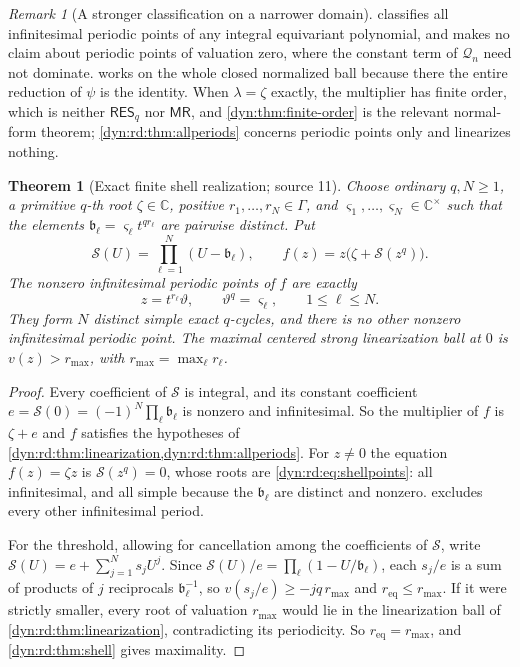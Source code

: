 \documentclass[11pt,letterpaper]{article}
\newtheorem{theorem}{Theorem}[section]
\theoremstyle{definition}
\theoremstyle{remark}
\newtheorem{remark}[remark]{Remark}
\newcommand{\C}{\mathbb C}
\newcommand{\resq}{\mathsf{RES}_q}
\newcommand{\mres}{\mathsf{MR}}
\numberwithin{equation}{section}
\begin{document}
\begin{remark}[A stronger classification on a narrower domain]
\label{dyn:rd:rem:narrower}
 classifies all infinitesimal periodic points of
any integral equivariant polynomial, and makes no claim about periodic points
of valuation zero, where the constant term of $\mathcal Q_n$ need not
dominate.  works on the whole closed
normalized ball because there the entire reduction of $\psi$ is the
identity. When $\lambda=\zeta$ exactly, the multiplier has finite order,
which is neither $\resq$ nor $\mres$, and \cref{dyn:thm:finite-order} is
the relevant normal-form theorem; \cref{dyn:rd:thm:allperiods} concerns
periodic points only and linearizes nothing.
\end{remark}

\begin{theorem}[Exact finite shell realization; source 11]
\label{dyn:rd:thm:allshells}
Choose ordinary $q,N\ge1$, a primitive $q$-th root $\zeta\in\C$, positive
$r_1,\dots,r_N\in\Gamma$, and $\varsigma_1,\dots,\varsigma_N\in\C^{\times}$
such that the elements $\mathfrak b_\ell=\varsigma_\ell t^{qr_\ell}$ are
pairwise distinct. Put
\begin{equation}\label{dyn:rd:eq:shellf}
 \mathcal S(U)=\prod_{\ell=1}^{N}(U-\mathfrak b_\ell),\qquad
 f(z)=z\bigl(\zeta+\mathcal S(z^{q})\bigr).
\end{equation}
The nonzero infinitesimal periodic points of $f$ are exactly
\begin{equation}\label{dyn:rd:eq:shellpoints}
 z=t^{r_\ell}\vartheta,\qquad \vartheta^{q}=\varsigma_\ell,\qquad
 1\le\ell\le N .
\end{equation}
They form $N$ distinct simple exact $q$-cycles, and there is no other
nonzero infinitesimal periodic point. The maximal centered strong
linearization ball at $0$ is $v(z)>r_{\max}$, with
$r_{\max}=\max_\ell r_\ell$.
\end{theorem}
\begin{proof}
Every coefficient of $\mathcal S$ is integral, and its constant coefficient
$e=\mathcal S(0)=(-1)^{N}\prod_\ell\mathfrak b_\ell$ is nonzero and
infinitesimal. So the multiplier of $f$ is $\zeta+e$ and $f$ satisfies the
hypotheses of \cref{dyn:rd:thm:linearization,dyn:rd:thm:allperiods}. For
$z\ne0$ the equation $f(z)=\zeta z$ is $\mathcal S(z^{q})=0$, whose roots
are \eqref{dyn:rd:eq:shellpoints}: all infinitesimal, and all simple because
the $\mathfrak b_\ell$ are distinct and nonzero.
 excludes every other infinitesimal period.

For the threshold, allowing for cancellation among the coefficients of
$\mathcal S$, write $\mathcal S(U)=e+\sum_{j=1}^{N}s_jU^{j}$. Since
$\mathcal S(U)/e=\prod_\ell(1-U/\mathfrak b_\ell)$, each $s_j/e$ is a sum of
products of $j$ reciprocals $\mathfrak b_\ell^{-1}$, so
$v(s_j/e)\ge-jq\,r_{\max}$ and $r_{\mathrm{eq}}\le r_{\max}$. If it were
strictly smaller, every root of valuation $r_{\max}$ would lie in the
linearization ball of \cref{dyn:rd:thm:linearization}, contradicting its
periodicity. So $r_{\mathrm{eq}}=r_{\max}$, and
\cref{dyn:rd:thm:shell} gives maximality.
\end{proof}
\end{document}
